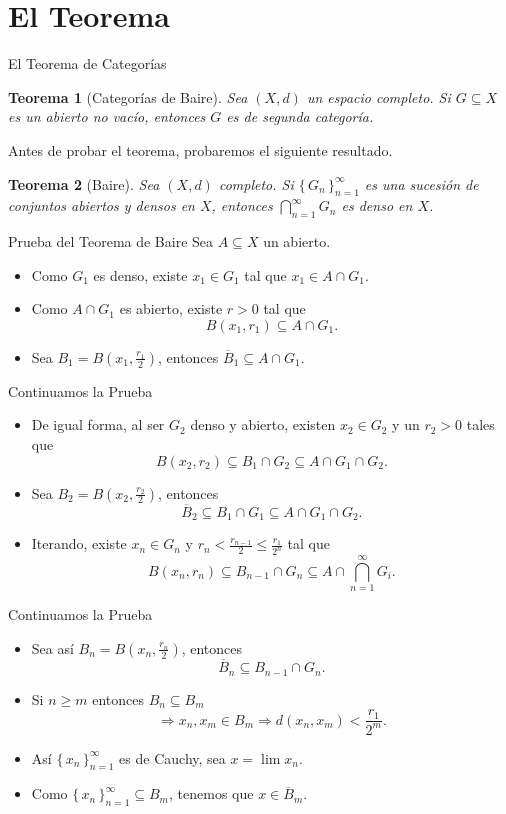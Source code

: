 \documentclass[utf8]{beamer}
\theoremstyle{plain}
\newtheorem{Th}{Teorema}               %
\theoremstyle{definition}
\theoremstyle{remark}
\numberwithin{equation}{section}
\newcommand{\set}[1]{\{\,#1\,\}}    %
\renewcommand{\geq}{\geqslant}          %
\renewcommand{\leq}{\leqslant}          %
\newcommand{\To}{\Rightarrow}
\newcommand{\ov}{\overline}
\newcommand{\sucn}{_{n=1}^\infty} %
\begin{document}
\section{El Teorema}
\begin{frame}{El Teorema de Categorías}
  \begin{Th}[Categorías de Baire]\label{thm:cats}
    Sea $(X,d)$ un espacio completo. Si $G\subseteq X$ es un abierto no vacío, entonces $G$ es de segunda categoría.
  \end{Th}
  Antes de probar el teorema, probaremos el siguiente resultado.
  \begin{Th}[Baire]\label{thm:Baire}
    Sea $(X,d)$ completo. Si $\set{G_n}\sucn$ es una sucesión de conjuntos abiertos y densos en $X$, entonces $\bigcap\sucn G_n$ es denso en $X$.
  \end{Th} 
\end{frame}

\begin{frame}{Prueba del Teorema de Baire}
  Sea $A\subseteq X$ un abierto. 
  \begin{itemize}
    \item Como $G_1$ es denso, existe $x_1\in G_1$ tal que $x_1\in A\cap G_1$.
    \item Como $A\cap G_1$ es abierto, existe $r>0$ tal que 
    $$B(x_1,r_1)\subseteq A\cap G_1.$$
    \item Sea $B_1=B\left(x_1,\frac{r_1}{2}\right)$, entonces $\ov B_1\subseteq A\cap G_1$.
  \end{itemize}
\end{frame}

\begin{frame}{Continuamos la Prueba}
  \begin{itemize}
    \item De igual forma, al ser $G_2$ denso y abierto, existen $x_2\in G_2$ y un $r_2>0$ tales que 
     $$B(x_2,r_2)\subseteq B_1\cap G_2\subseteq A\cap G_1\cap G_2.$$
     \item Sea $B_2=B\left(x_2,\frac{r_2}{2}\right)$, entonces 
     $$\ov B_2\subseteq B_1\cap G_1\subseteq A\cap G_1\cap G_2.$$
     \item Iterando, existe $x_n\in G_n$ y $r_n<\frac{r_{n-1}}{2}\leq \frac{r_1}{2^n}$ tal que 
     $$B(x_n,r_n)\subseteq B_{n-1}\cap G_n\subseteq A\cap \bigcap\sucn G_i.$$
  \end{itemize}
\end{frame}

\begin{frame}{Continuamos la Prueba}
  \begin{itemize}
    \item Sea así $B_n=B\left(x_n,\frac{r_n}{2}\right)$, entonces
    $$\ov B_n\subseteq B_{n-1}\cap G_n.$$
    \item Si $n\geq m$ entonces $B_n\subseteq B_m$
    $$\To x_n,x_m\in B_m\To d(x_n,x_m)<\frac{r_1}{2^m}.$$
    \item Así $\set{x_n}\sucn$ es de Cauchy, sea $x=\lim x_n$.
    \item Como $\set{x_n}\sucn\subseteq B_m$, tenemos que $x\in\ov B_m$.
  \end{itemize} 
\end{frame}
\end{document}
